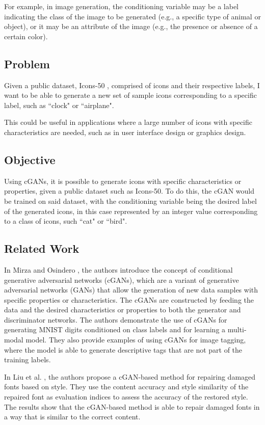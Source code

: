 \documentclass[conference]{IEEEtran}
\begin{document}
For example, in image generation, the conditioning variable may be a label indicating the class of the image to be generated (e.g., a specific type of animal or object), or it may be an attribute of the image (e.g., the presence or absence of a certain color).

\subsection{Problem}
Given a public dataset, Icons-50 \cite{Icons50, Hendrycks2018}, comprised of icons and their respective labels, I want to be able to generate a new set of sample icons corresponding to a specific label, such as ``clock" or ``airplane".

This could be useful in applications where a large number of icons with specific characteristics are needed, such as in user interface design or graphics design.

\subsection{Objective}
Using cGANs, it is possible to generate icons with specific characteristics or properties, given a public dataset such as Icons-50. To do this, the cGAN would be trained on said dataset, with the conditioning variable being the desired label of the generated icons, in this case represented by an integer value corresponding to a class of icons, such ``cat" or ``bird".

\subsection{Related Work}
In Mirza and Osindero \cite{Mirza2014}, the authors introduce the concept of conditional generative adversarial networks (cGANs), which are a variant of generative adversarial networks (GANs) that allow the generation of new data samples with specific properties or characteristics. The cGANs are constructed by feeding the data and the desired characteristics or properties to both the generator and discriminator networks. The authors demonstrate the use of cGANs for generating MNIST digits conditioned on class labels and for learning a multi-modal model. They also provide examples of using cGANs for image tagging, where the model is able to generate descriptive tags that are not part of the training labels.

In Liu et al. \cite{Liu2021SCCGAN:CGAN}, the authors propose a cGAN-based method for repairing damaged fonts based on style. They use the content accuracy and style similarity of the repaired font as evaluation indices to assess the accuracy of the restored style. The results show that the cGAN-based method is able to repair damaged fonts in a way that is similar to the correct content.
\end{document}
